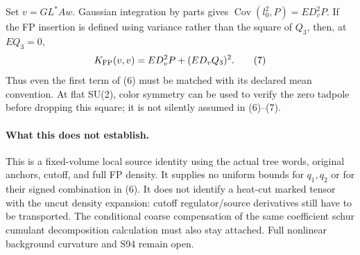\documentclass[11pt]{article}
\begin{document}
Set $v=GL^*Aw$. Gaussian integration by parts gives
$\operatorname{Cov}(l_0^2,P)=E D_v^2P$.
If the FP insertion is defined using variance rather than the square
of $Q_3$, then, at $EQ_3=0$,
\[
 K_{\rm FP}(v,v)=E D_v^2P+(E D_vQ_3)^2. \tag{7}
\]
Thus even the first term of (6) must be matched with its declared
mean convention. At flat SU(2), color symmetry can be used to verify
the zero tadpole before dropping this square; it is not silently
assumed in (6)--(7).

\paragraph{What this does not establish.}
This is a fixed-volume local source identity using the actual tree
words, original anchors, cutoff, and full FP density. It supplies no
uniform bounds for $q_1,q_2$ or for their signed combination in (6).
It does not identify a heat-cut marked tensor with the uncut density
expansion: cutoff regulator/source derivatives still have to be
transported. The conditional coarse compensation of the same coefficient schur cumulant decomposition calculation must also stay
attached. Full nonlinear background curvature and S94 remain open.
\end{document}
